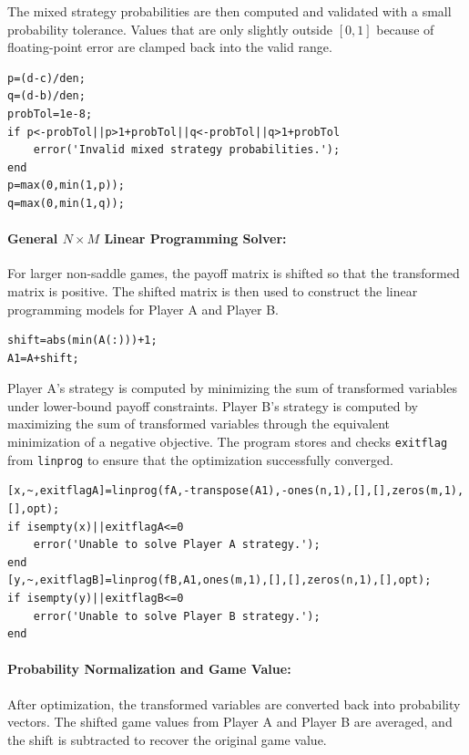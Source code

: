The mixed strategy probabilities are then computed and validated with a small probability tolerance. Values that are only slightly outside \([0,1]\) because of floating-point error are clamped back into the valid range.

\begin{lstlisting}[style=code]
p=(d-c)/den;
q=(d-b)/den;
probTol=1e-8;
if p<-probTol||p>1+probTol||q<-probTol||q>1+probTol
    error('Invalid mixed strategy probabilities.');
end
p=max(0,min(1,p));
q=max(0,min(1,q));
\end{lstlisting}

\paragraph{General \(N \times M\) Linear Programming Solver:}

For larger non-saddle games, the payoff matrix is shifted so that the transformed matrix is positive. The shifted matrix is then used to construct the linear programming models for Player A and Player B.

\begin{lstlisting}[style=code]
shift=abs(min(A(:)))+1;
A1=A+shift;
\end{lstlisting}

Player A's strategy is computed by minimizing the sum of transformed variables under lower-bound payoff constraints. Player B's strategy is computed by maximizing the sum of transformed variables through the equivalent minimization of a negative objective. The program stores and checks \texttt{exitflag} from \texttt{linprog} to ensure that the optimization successfully converged.

\begin{lstlisting}[style=code]
[x,~,exitflagA]=linprog(fA,-transpose(A1),-ones(n,1),[],[],zeros(m,1),[],opt);
if isempty(x)||exitflagA<=0
    error('Unable to solve Player A strategy.');
end
[y,~,exitflagB]=linprog(fB,A1,ones(m,1),[],[],zeros(n,1),[],opt);
if isempty(y)||exitflagB<=0
    error('Unable to solve Player B strategy.');
end
\end{lstlisting}

\paragraph{Probability Normalization and Game Value:}

After optimization, the transformed variables are converted back into probability vectors. The shifted game values from Player A and Player B are averaged, and the shift is subtracted to recover the original game value.

